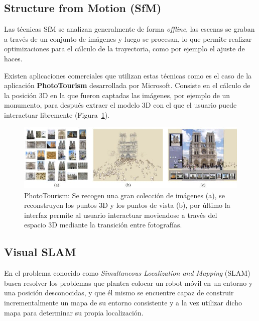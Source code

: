 \subsection{Structure from Motion (SfM)}

Las técnicas SfM se analizan generalmente de forma \textit{offline}, las escenas se graban a través de un conjunto de imágenes y luego se procesan, lo que permite realizar optimizaciones para el cálculo de la trayectoria, como por ejemplo el ajuste de haces.

Existen aplicaciones comerciales que utilizan estas técnicas como es el caso de la aplicación \textbf{PhotoTourism} \parencite{Reference2} desarrollada por Microsoft. Consiste en el cálculo de la posición 3D en la que fueron captadas las imágenes, por ejemplo de un monumento, para después extraer el modelo 3D con el que el usuario puede interactuar libremente (Figura~\ref{fig:Tourism}).

\begin{figure}[th]
\centering
\includegraphics[scale=0.57]{Figures/phototourism.png}
\decoRule
\caption[PhotoTourism]{PhotoTourism: Se recogen una gran colección de imágenes (a), se reconstruyen los puntos 3D y los puntos de vista (b), por último la interfaz permite al usuario interactuar moviendose a través del espacio 3D mediante la transición entre fotografías.}
\label{fig:Tourism}
\end{figure}

\subsection{Visual SLAM}

En el problema conocido como \textit{Simultaneous Localization and Mapping} (SLAM) busca resolver los problemas que plantea colocar un robot móvil en un entorno y una posición desconocidas, y que él mismo se encuentre capaz de construir incrementalmente un mapa de su entorno consistente y a la vez utilizar dicho mapa para determinar su propia localización.

